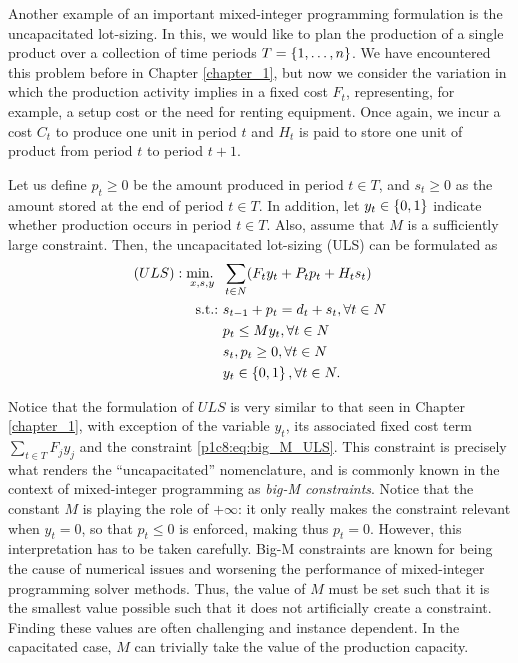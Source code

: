 Another example of an important mixed-integer programming formulation is the uncapacitated lot-sizing. In this, we would like to plan the production of a single product over a collection of time periods $T = \left\{ 1, \dots, n \right \}$. We have encountered this problem before in Chapter \ref{chapter_1}, but now we consider the variation in which the production activity implies in a fixed cost $F_t$, representing, for example, a setup cost or the need for renting equipment. Once again, we incur a cost $C_t$ to produce one unit in period $t$ and $H_t$ is paid to store one unit of product from period $t$ to period $t+1$.

Let us define $p_t \geq 0$ be the amount produced in period $t\in T$, and $s_t \geq 0$ as the amount stored at the end of period $t \in T$. In addition, let $y_t \in \left\{ 0,1 \right \}$ indicate whether production occurs in period $t\in T$. Also, assume that $M$ is a sufficiently large constraint. Then, the uncapacitated lot-sizing (ULS) can be formulated as
%
\begin{align}
	(ULS) : \mathop{\text{min.~}}_{x,s,y} \ & \sum_{t \in N} (F_ty_t + P_tp_t + H_ts_t) \nonumber \\
	\mathop{\text{s.t.:~}} & s_{t-1} + p_t = d_t + s_t, \forall t \in N \nonumber \\
	& p_t \leq My_t, \forall t \in N  \label{p1c8:eq:big_M_ULS}\\
	&s_t, p_t \geq 0, \forall t \in N \nonumber \\
	&y_t \in \left\{ 0,1 \right \}, \forall t \in N. \nonumber
\end{align} 

Notice that the formulation of $ULS$ is very similar to that seen in Chapter \ref{chapter_1}, with exception of the variable $y_t$, its associated fixed cost term $\sum_{t \in T} F_jy_j$ and the constraint \eqref{p1c8:eq:big_M_ULS}. This constraint is precisely what renders the ``uncapacitated'' nomenclature, and is commonly known in the context of mixed-integer programming as \emph{big-M constraints}. Notice that the constant $M$ is playing the role of $+\infty$: it only really makes the constraint relevant when $y_t = 0$, so that $p_t \le 0$ is enforced, making thus $p_t = 0$. However, this interpretation has to be taken carefully. Big-M constraints are known for being the cause of numerical issues and worsening the performance of mixed-integer programming solver methods. Thus, the value of $M$ must be set such that it is the smallest value possible such that it does not artificially create a constraint. Finding these values are often challenging and instance dependent. In the capacitated case, $M$ can trivially take the value of the production capacity. 
 
